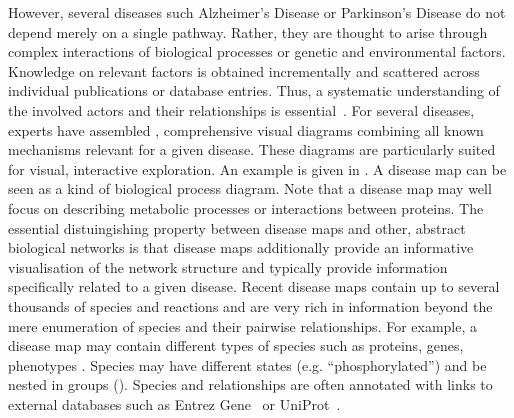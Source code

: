 \documentclass[
	fontsize=10pt, %
	twoside=true, %
	secnumdepth=1, %
  toc=indentunnumbered %
]{kaobook}
\begin{document}
However, several diseases such Alzheimer's Disease or Parkinson's Disease do not depend
merely on a single pathway. Rather, they are thought to arise through complex
interactions of biological processes or genetic and environmental factors.
Knowledge on relevant factors is obtained incrementally and scattered across
individual publications or database entries.
Thus, a systematic understanding of the involved actors and their
relationships is essential~\cite{ostaszewski_CommunitydrivenRoadmapIntegrated_2019,
  mazein_SystemsMedicineDisease_2018}.
% 
For several diseases, experts have assembled , comprehensive
visual diagrams combining all known mechanisms relevant for a given disease.
These diagrams are particularly suited for visual, interactive exploration. An
example is given in . A disease map can be
seen as a kind of biological process diagram. Note that a disease map may well
focus on describing metabolic processes or interactions between proteins. The
essential distuingishing property between disease maps and other, abstract
biological networks is that disease maps additionally provide an informative
visualisation of the network structure and typically provide information specifically
related to a given disease. Recent disease maps contain up to several thousands
of species and reactions and are very rich in information beyond the mere
enumeration of species and their pairwise relationships. For example, a disease
map may contain different types of species such as proteins, genes, phenotypes
\etc. Species may have different states (e.g. ``phosphorylated'') and be nested
in groups (). Species and relationships are often
annotated with links to external databases such as Entrez Gene~\cite{maglott_EntrezGeneGenecentered_2005} or UniProt~\cite{theuniprotconsortium_UniProtUniversalProtein_2021}. 

\end{document}
